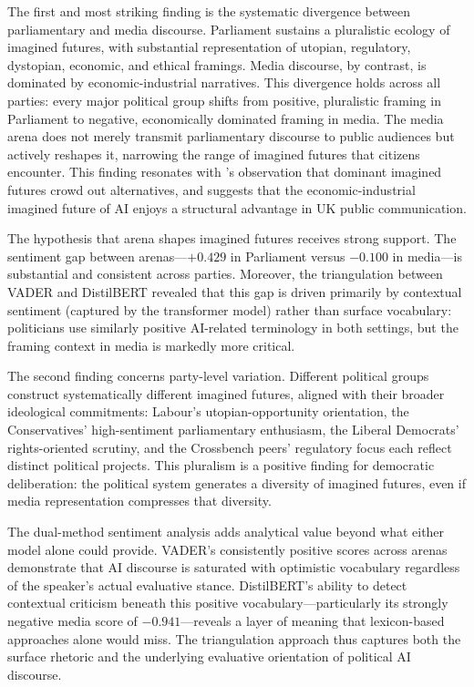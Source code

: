 The first and most striking finding is the systematic divergence between parliamentary and media discourse. Parliament sustains a pluralistic ecology of imagined futures, with substantial representation of utopian, regulatory, dystopian, economic, and ethical framings. Media discourse, by contrast, is dominated by economic-industrial narratives. This divergence holds across all parties: every major political group shifts from positive, pluralistic framing in Parliament to negative, economically dominated framing in media. The media arena does not merely transmit parliamentary discourse to public audiences but actively reshapes it, narrowing the range of imagined futures that citizens encounter. This finding resonates with \textcite{friedrich2024}'s observation that dominant imagined futures crowd out alternatives, and suggests that the economic-industrial imagined future of AI enjoys a structural advantage in UK public communication.

The hypothesis that arena shapes imagined futures receives strong support. The sentiment gap between arenas---$+0.429$ in Parliament versus $-0.100$ in media---is substantial and consistent across parties. Moreover, the triangulation between VADER and DistilBERT revealed that this gap is driven primarily by contextual sentiment (captured by the transformer model) rather than surface vocabulary: politicians use similarly positive AI-related terminology in both settings, but the framing context in media is markedly more critical.

The second finding concerns party-level variation. Different political groups construct systematically different imagined futures, aligned with their broader ideological commitments: Labour's utopian-opportunity orientation, the Conservatives' high-sentiment parliamentary enthusiasm, the Liberal Democrats' rights-oriented scrutiny, and the Crossbench peers' regulatory focus each reflect distinct political projects. This pluralism is a positive finding for democratic deliberation: the political system generates a diversity of imagined futures, even if media representation compresses that diversity.

The dual-method sentiment analysis adds analytical value beyond what either model alone could provide. VADER's consistently positive scores across arenas demonstrate that AI discourse is saturated with optimistic vocabulary regardless of the speaker's actual evaluative stance. DistilBERT's ability to detect contextual criticism beneath this positive vocabulary---particularly its strongly negative media score of $-0.941$---reveals a layer of meaning that lexicon-based approaches alone would miss. The triangulation approach thus captures both the surface rhetoric and the underlying evaluative orientation of political AI discourse.


